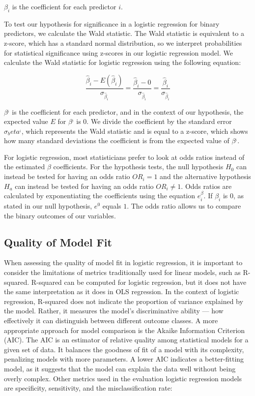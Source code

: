 \documentclass[
]{article}
\begin{document}
\(\beta_i\) is the coefficient for each predictor \(i\).

To test our hypothesis for significance in a logistic regression for
binary predictors, we calculate the Wald statistic. The Wald statistic
is equivalent to a z-score, which has a standard normal distribution, so
we interpret probabilities for statistical significance using z-scores
in our logistic regression model. We calculate the Wald statistic for
logistic regression using the following equation:

\[\frac{\hat{\beta}_i - E(\hat{\beta}_i)}{\sigma_{\hat{\beta}_i}} = \frac{\hat{\beta}_i - 0}{\sigma_{\hat{\beta}_i}} = \frac{\hat{\beta}_i}{\sigma_{\hat{\beta}_i}}\]

\(\beta^_i\) is the coefficient for each predictor, and in the context
of our hypothesis, the expected value \(E\) for \(\beta^_i\) is 0. We
divide the coefficient by the standard error \(\sigma_beta ^_i\), which
represents the Wald statistic and is equal to a z-score, which shows how
many standard deviations the coefficient is from the expected value of
\(\beta^_i\).

For logistic regression, most statisticians prefer to look at odds
ratios instead of the estimated \(\beta\) coefficients. For the
hypothesis tests, the null hypothesis \(H_0\) can instead be tested for
having an odds ratio \(OR_i = 1\) and the alternative hypothesis \(H_a\)
can instead be tested for having an odds ratio \(OR_i \neq 1\). Odds
ratios are calculated by exponentiating the coefficients using the
equation \(e^\beta_i\). If \(\beta_i\) is 0, as stated in our null
hypothesis, \(e^0\) equals \(1\). The odds ratio allows us to compare
the binary outcomes of our variables.

\hypertarget{quality-of-model-fit}{%
\subsection{Quality of Model Fit}\label{quality-of-model-fit}}

When assessing the quality of model fit in logistic regression, it is
important to consider the limitations of metrics traditionally used for
linear models, such as R-squared. R-squared can be computed for logistic
regression, but it does not have the same interpretation as it does in
OLS regression. In the context of logistic regression, R-squared does
not indicate the proportion of variance explained by the model. Rather,
it measures the model's discriminative ability --- how effectively it
can distinguish between different outcome classes. A more appropriate
approach for model comparison is the Akaike Information Criterion (AIC).
The AIC is an estimator of relative quality among statistical models for
a given set of data. It balances the goodness of fit of a model with its
complexity, penalizing models with more parameters. A lower AIC
indicates a better-fitting model, as it suggests that the model can
explain the data well without being overly complex. Other metrics used
in the evaluation logistic regression models are specificity,
sensitivity, and the misclassification rate:
\end{document}
